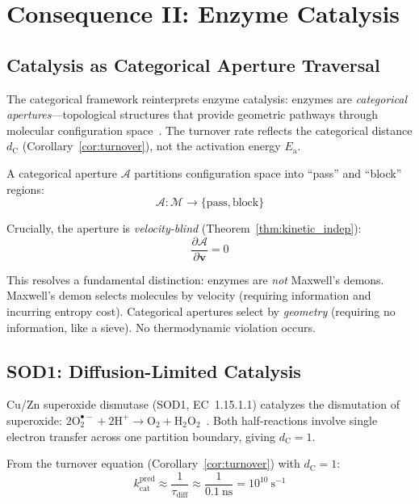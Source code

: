 \documentclass[aps,prx,superscriptaddress,twocolumn,10pt,a4paper,longbibliography,preprint]{revtex4-2}
\newcommand{\dC}{d_{\mathrm{C}}}
\newcommand{\kcat}{k_{\mathrm{cat}}}
\newcommand{\Ea}{E_{\mathrm{a}}}
\newcommand{\calA}{\mathcal{A}}
\newcommand{\calM}{\mathcal{M}}
\theoremstyle{definition}
\theoremstyle{remark}
\begin{document}
\section{Consequence II: Enzyme Catalysis}
\label{sec:catalysis}

\subsection{Catalysis as Categorical Aperture Traversal}

The categorical framework reinterprets enzyme catalysis: enzymes are \emph{categorical apertures}---topological structures that provide geometric pathways through molecular configuration space~\cite{Sachikonye2026a}. The turnover rate reflects the categorical distance $\dC$ (Corollary~\ref{cor:turnover}), not the activation energy $\Ea$.

A categorical aperture $\calA$ partitions configuration space into ``pass'' and ``block'' regions:
\begin{equation}
\calA: \calM \to \{\text{pass}, \text{block}\}
\end{equation}

Crucially, the aperture is \emph{velocity-blind} (Theorem~\ref{thm:kinetic_indep}):
\begin{equation}
\frac{\partial \calA}{\partial \mathbf{v}} = 0
\end{equation}

This resolves a fundamental distinction: enzymes are \emph{not} Maxwell's demons. Maxwell's demon selects molecules by velocity (requiring information and incurring entropy cost). Categorical apertures select by \emph{geometry} (requiring no information, like a sieve). No thermodynamic violation occurs.

\subsection{SOD1: Diffusion-Limited Catalysis}

Cu/Zn superoxide dismutase (SOD1, EC~1.15.1.1) catalyzes the dismutation of superoxide: $2\text{O}_2^{\bullet-} + 2\text{H}^+ \to \text{O}_2 + \text{H}_2\text{O}_2$~\cite{McCord1969}. Both half-reactions involve single electron transfer across one partition boundary, giving $\dC = 1$.

From the turnover equation (Corollary~\ref{cor:turnover}) with $\dC = 1$:
\begin{equation}
\kcat^{\text{pred}} \approx \frac{1}{\tau_{\text{diff}}} \approx \frac{1}{0.1~\text{ns}} = 10^{10}~\text{s}^{-1}
\end{equation}
\end{document}
